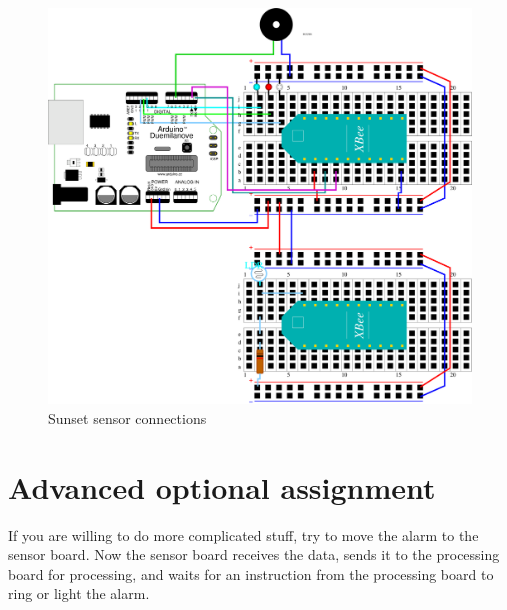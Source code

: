 \begin{figure}[htbp]
  \centering
  \includegraphics[width=0.9\linewidth]{figures/sunset_sensor.eps}
  \caption{Sunset sensor connections}
  \label{fig:sunset_sensor}
\end{figure}


\section{Advanced optional assignment}

If you are willing to do more complicated stuff, try to move the alarm to the sensor board. 
Now the sensor board receives the data, sends it to the processing board for processing, and waits for an instruction from the processing board to ring or light the alarm.

